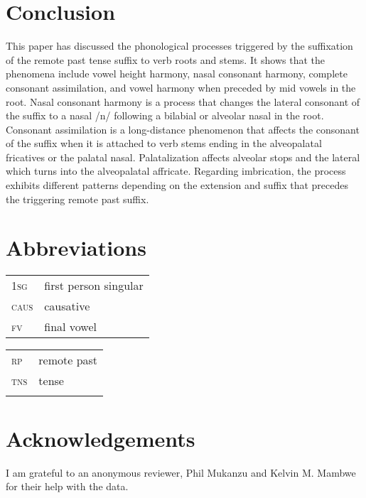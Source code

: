 \documentclass[output=paper]{langsci/langscibook}
\begin{document}
\section{Conclusion} \label{§5:conclusion.kawasha}

This paper has discussed the phonological processes triggered by the suffixation of the remote past tense suffix to verb roots and stems. It shows that the phenomena include vowel height harmony, nasal consonant harmony, complete consonant assimilation, and vowel harmony when preceded by mid vowels in the root. Nasal consonant harmony is a process that changes the lateral consonant of the suffix to a nasal /n/ following a bilabial or alveolar nasal in the root. Consonant assimilation is a long-distance phenomenon that affects the consonant of the suffix when it is attached to verb stems ending in the alveopalatal fricatives or the palatal nasal. Palatalization affects alveolar stops and the lateral which turns into the alveopalatal affricate. Regarding imbrication, the process exhibits different patterns depending on the extension and suffix that precedes the triggering remote past suffix. 



\section*{Abbreviations}

\begin{tabularx}{.45\textwidth}{lX}
\textsc{1sg} & first person singular \\
\textsc{caus} & causative  \\
\textsc{fv} & final vowel \\
\end{tabularx}
\begin{tabularx}{.45\textwidth}{lX}
\textsc{rp} & remote past \\
\textsc{tns} & tense \\
\\
\end{tabularx}



\section*{Acknowledgements}

I am grateful to an anonymous reviewer, Phil Mukanzu and Kelvin M. Mambwe for their help with the data. 



{\sloppy
\printbibliography[heading=subbibliography,notkeyword=this]
}
\end{document}
